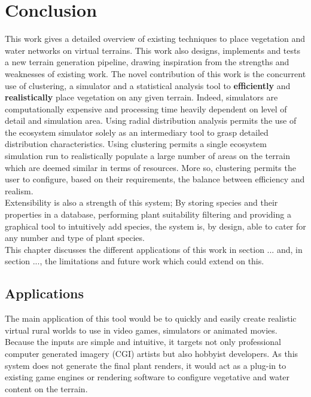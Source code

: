 \chapter{Conclusion} \label{chap:conclusion}

This work gives a detailed overview of existing techniques to place vegetation and water networks on virtual terrains. This work also designs, implements and tests a new terrain generation pipeline, drawing inspiration from the strengths and weaknesses of existing work. The novel contribution of this work is the concurrent use of clustering, a simulator and a statistical analysis tool to \textbf{efficiently} and \textbf{realistically} place vegetation on any given terrain. Indeed, simulators are computationally expensive and processing time heavily dependent on level of detail and simulation area. Using radial distribution analysis permits the use of the ecosystem simulator solely as an intermediary tool to grasp detailed distribution characteristics. Using clustering permits a single ecosystem simulation run to realistically populate a large number of areas on the terrain which are deemed similar in terms of resources. More so, clustering permits the user to configure, based on their requirements, the balance between efficiency and realism. \\
Extensibility is also a strength of this system; By storing species and their properties in a database, performing plant suitability filtering and providing a graphical tool to intuitively add species, the system is, by design, able to cater for any number and type of plant species.\\
This chapter discusses the different applications of this work in section ... and, in section ..., the limitations and future work which could extend on this.

\section{Applications} \label{sec:applications}

The main application of this tool would be to quickly and easily create realistic virtual rural worlds to use in video games, simulators or animated movies. Because the inputs are simple and intuitive, it targets not only professional computer generated imagery (CGI) artists but also hobbyist developers. As this system does not generate the final plant renders, it would act as a plug-in to existing game engines or rendering software to configure vegetative and water content on the terrain.\\

